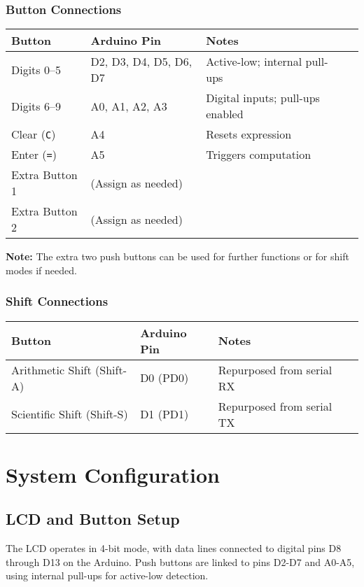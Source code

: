 \documentclass{article}
\theoremstyle{remark}
\begin{document}
\subsubsection{ Button Connections}
\begin{center}
\begin{tabular}{|l|l|l|l|}
\hline
\textbf{Button}       & \textbf{Arduino Pin} & \textbf{Notes} \\ \hline
Digits 0--5             & D2, D3, D4, D5, D6, D7   & Active-low; internal pull-ups \\ \hline
Digits 6--9            & A0, A1, A2, A3           & Digital inputs; pull-ups enabled \\ \hline
Clear (\texttt{C})               & A4                      & Resets expression \\ \hline
Enter (\texttt{=})         & A5                      & Triggers computation \\ \hline
Extra Button 1     & (Assign as needed)      & \\ \hline
Extra Button 2       & (Assign as needed)      & \\ \hline
\end{tabular}
\end{center}
\textbf{Note:} The extra two push buttons can be used for further functions or for shift modes if needed.

\subsubsection{Shift Connections}
\begin{center}
\begin{tabular}{|l|l|l|l|}
\hline
\textbf{Button}                        & \textbf{Arduino Pin} & \textbf{Notes} \\ \hline
Arithmetic Shift (Shift-A)     & D0 (PD0)               & Repurposed from serial RX \\ \hline
Scientific Shift (Shift-S)        & D1 (PD1)               & Repurposed from serial TX \\ \hline
\end{tabular}
\end{center}

\section{System Configuration}
\subsection{LCD and Button Setup}
The LCD operates in 4-bit mode, with data lines connected to digital pins D8 through D13 on the Arduino. Push buttons are linked to pins D2-D7 and A0-A5, using internal pull-ups for active-low detection.
\end{document}
